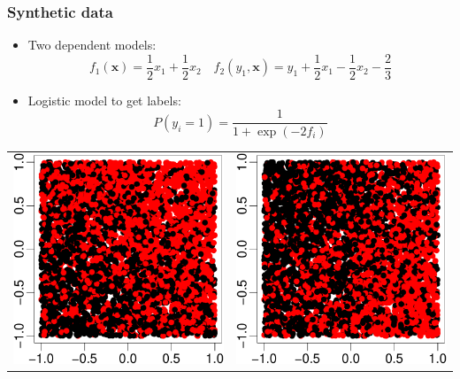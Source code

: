 \documentclass[]{beamer}
\renewcommand{\Pr}{P}
\newcommand{\bx}{\boldsymbol{x}}
\begin{document}
\begin{frame}
\frametitle{Synthetic data}

\begin{itemize}
\item Two dependent models:
$$
f_1(\bx) = \frac{1}{2} x_1 + \frac{1}{2} x_2 \quad f_2(y_1, \bx) = y_1 + \frac{1}{2} x_1 - \frac{1}{2} x_2 - \frac{2}{3}
$$
\item Logistic model to get labels:
$$
\Pr(y_i = 1) = \frac{1}{1 + \exp(-2f_i)}
$$
\end{itemize}
\vskip12pt
\begin{center}
\begin{tabular}{@{}c@{$\quad\quad\quad$}c@{}}
\includegraphics[width = .35\textwidth]{pics/dep-1.pdf} &
\includegraphics[width = .35\textwidth]{pics/dep-2.pdf} \\
\end{tabular}
\end{center}

\end{frame}

\end{document}
